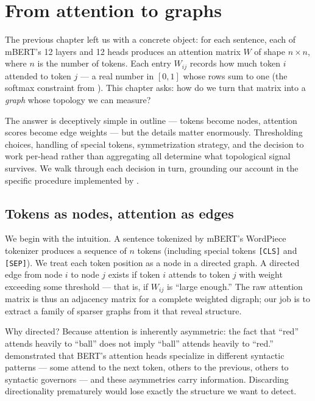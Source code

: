 \chapter{From attention to graphs}
\label{ch:graphs}

The previous chapter left us with a concrete object: for each sentence, each of
mBERT's 12 layers and 12 heads produces an attention matrix $W$ of shape
$n \times n$, where $n$ is the number of tokens.  Each entry $W_{ij}$ records
how much token $i$ attended to token $j$ --- a real number in $[0, 1]$ whose
rows sum to one (the softmax constraint from \textcite{vaswani2017}).  This
chapter asks: how do we turn that matrix into a \emph{graph} whose topology we
can measure?

The answer is deceptively simple in outline --- tokens become nodes, attention
scores become edge weights --- but the details matter enormously.  Thresholding
choices, handling of special tokens, symmetrization strategy, and the decision
to work per-head rather than aggregating all determine what topological signal
survives.  We walk through each decision in turn, grounding our account in the
specific procedure implemented by \textcite{kushnareva2021}.

\section{Tokens as nodes, attention as edges}

We begin with the intuition.  A sentence tokenized by mBERT's WordPiece
tokenizer produces a sequence of $n$ tokens (including special tokens \texttt{[CLS]}
and \texttt{[SEP]}).  We treat each token position as a node in a directed
graph.  A directed edge from node $i$ to node $j$ exists if token $i$ attends
to token $j$ with weight exceeding some threshold --- that is, if $W_{ij}$
is ``large enough.''  The raw attention matrix is thus an adjacency matrix
for a complete weighted digraph; our job is to extract a family of sparser
graphs from it that reveal structure.

Why directed?  Because attention is inherently asymmetric: the fact that
``red'' attends heavily to ``ball'' does not imply ``ball'' attends heavily
to ``red.''  \textcite{clark2019} demonstrated that BERT's attention heads
specialize in different syntactic patterns --- some attend to the next token,
others to the previous, others to syntactic governors --- and these asymmetries
carry information.  Discarding directionality prematurely would lose exactly the
structure we want to detect.

